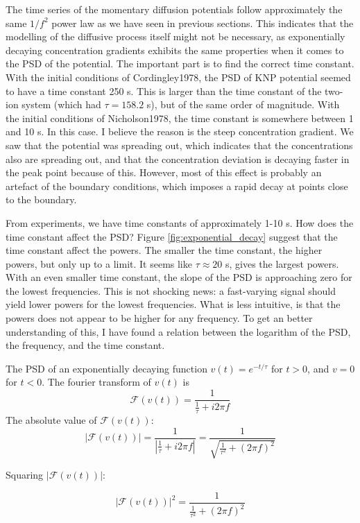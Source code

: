 \documentclass{article}
\begin{document}
The time series of the momentary diffusion potentials follow approximately the same $1/f^2$ power law as we have seen in previous sections. This indicates that the modelling of the diffusive process itself might not be necessary, as exponentially decaying concentration gradients exhibits the same properties when it comes to the PSD of the potential. The important part is to find the correct time constant. With the initial conditions of Cordingley1978, the PSD of KNP potential seemed to have a time constant 250 s. This is larger than the time constant of the two-ion system (which had $\tau = 158.2$ s), but of the same order of magnitude. With the initial conditions of Nicholson1978, the time constant is somewhere between 1 and 10 s. In this case. I believe the reason is the steep concentration gradient. We saw that the potential was spreading out, which indicates that the concentrations also are spreading out, and that the concentration deviation is decaying faster in the peak point because of this. However, most of this effect is probably an artefact of the boundary conditions, which imposes a rapid decay at points close to the boundary.



From experiments, we have time constants of approximately 1-10 s. How does the time constant affect the PSD? Figure \ref{fig:exponential_decay} suggest that the time constant affect the powers. The smaller the time constant, the higher powers, but only up to a limit. It seems like $\tau \approx 20 $ s, gives the largest powers. With an even smaller time constant, the slope of the PSD is approaching zero for the lowest frequencies. This is not shocking news: a fast-varying signal should yield lower powers for the lowest frequencies. What is less intuitive, is that the powers does not appear to be higher for any frequency. To get an better understanding of this, I have found a relation between the logarithm of the PSD, the frequency, and the time constant. 

The PSD of an exponentially decaying function $v(t) = e^{-t/\tau}$ for $t>0$, and $v=0$ for $t<0$.
The fourier transform of $v(t)$ is
$$
\mathcal{F}(v(t))= \frac{1}{\frac{1}{\tau} +i2\pi f}
$$
The absolute value of $\mathcal{F}(v(t))$:
$$
|\mathcal{F}(v(t))| = \frac{1}{|\frac{1}{\tau} +i2\pi f|}=\frac{1}{\sqrt{\frac{1}{\tau^2} +(2\pi f)^2}}
$$

Squaring $|\mathcal{F}(v(t))|$:

$$
|\mathcal{F}(v(t))|^2= \frac{1}{\frac{1}{\tau^2} +(2\pi f)^2}
$$
\end{document}
